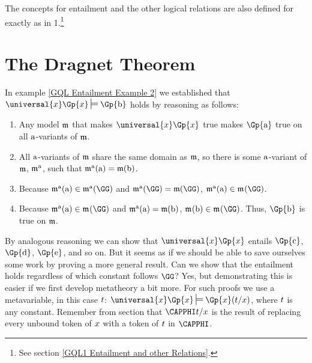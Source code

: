 The concepts for entailment and the other logical relations are also defined for \GQL{} exactly as in \GQL{}1.\footnote{See section \vref{GQL1 Entailment and other Relations}.} 


\section{The Dragnet Theorem}\label{Dragnet Theorem}

In example \ref{GQL Entailment Example 2} we established that $\universal{\variable{x}}\Gp{\variable{x}}\sdtstile{}{}\Gp{\constant{b}}$ holds by reasoning as follows:

\begin{enumerate}[label=(\roman*)]
	\item Any model $\mathfrak{m}$ that makes $\universal{\variable{x}}\Gp{\variable{x}}$ true makes $\Gp{\constant{a}}$ true on all $\mathrm{a}$-variants of $\mathfrak{m}$.
	\item All $\mathrm{a}$-variants of $\mathfrak{m}$ share the same domain as $\mathfrak{m}$, so there is some $\mathrm{a}$-variant of $\mathfrak{m}$, $\mathfrak{m^{\mathrm{\mathrm{a}}}_{\mathrm{}}}$, such that $\mathfrak{m^{\mathrm{\mathrm{a}}}_{\mathrm{}}}(\mathrm{a})=\mathfrak{m}(\mathrm{b})$.
	\item Because $\As{\constant{a}}{}(\constant{a})\in\As{\constant{a}}{}(\GG)$ and $\As{\constant{a}}{}(\GG)=\IntA(\GG)$, $\As{\constant{a}}{}(\constant{a})\in\As{}{}(\GG)$.
	\item Because $\As{\constant{a}}{}(\constant{a})\in\As{}{}(\GG)$ and $\mathfrak{m^{\mathrm{\mathrm{a}}}_{\mathrm{}}}(\mathrm{a})=\mathfrak{m}(\mathrm{b})$, $\As{}{}(\constant{b})\in\As{}{}(\GG)$.
	Thus, $\Gp{\constant{b}}$ is true on $\mathfrak{m}$.
\end{enumerate}

\noindent{}By analogous reasoning we can show that $\universal{\variable{x}}\Gp{\variable{x}}$ entails $\Gp{\constant{c}}$, $\Gp{\constant{d}}$, $\Gp{\constant{e}}$, and so on.
But it seems as if we should be able to save ourselves some work by proving a more general result.
Can we show that the entailment holds regardless of which constant follows $\GG$?
Yes, but demonstrating this is easier if we first develop \GQL{} metatheory a bit more.
For such proofs we use a metavariable, in this case $t$: $\universal{\variable{x}}\Gp{\variable{x}}\sdtstile{}{}\Gp{\variable{x}}(\variable{t}/\variable{x})$, where $t$ is any constant.
Remember from section  that $\CAPPHI\variable{t}/\variable{x}$ is the result of replacing every unbound token of $x$ with a token of $t$ in $\CAPPHI$.

